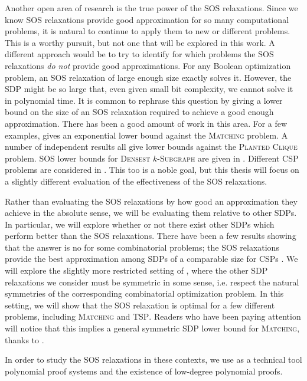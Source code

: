 Another open area of research is the true power of the SOS relaxations.
Since we know SOS relaxations provide good approximation for so many computational problems, it is natural to continue to apply them to new or different problems.
This is a worthy pursuit, but not one that will be explored in this work. 
A different approach would be to try to identify for which problems the SOS relaxations \emph{do not} provide good approximations.
For any Boolean optimization problem, an SOS relaxation of large enough size exactly solves it. 
However, the SDP might be so large that, even given small bit complexity, we cannot solve it in polynomial time. 
It is common to rephrase this question by giving a lower bound on the size of an SOS relaxation required to achieve a good enough approximation. 
There has been a good amount of work in this area. For a few examples, \cite{Gri01} gives an exponential lower bound against the \textsc{Matching} problem. A number of independent results \cite{RS15,MPW15,BHKKMP16} all give lower bounds against the \textsc{Planted Clique} problem. SOS lower bounds for \textsc{Densest $k$-Subgraph} are given in \cite{BCVGZ12}. Different \textsc{CSP} problems are considered in \cite{GMT09,Tul09,Sch08,LRS15}. 
This too is a noble goal, but this thesis will focus on a slightly different evaluation of the effectiveness of the SOS relaxations.

Rather than evaluating the SOS relaxations by how good an approximation they achieve in the absolute sense, we will be evaluating them relative to other SDPs. 
In particular, we will explore whether or not there exist other SDPs which perform better than the SOS relaxations.
There have been a few results showing that the answer is no for some combinatorial problems; the SOS relaxations provide the best approximation among SDPs of a comparable size for CSPs \cite{LRST14,LRS15}. We will explore the slightly more restricted setting of \cite{LRST14}, where the other SDP relaxations we consider must be symmetric in some sense, i.e. respect the natural symmetries of the corresponding combinatorial optimization problem. In this setting, we will show that the SOS relaxation is optimal for a few different problems, including \textsc{Matching} and \textsc{TSP}. Readers who have been paying attention will notice that this implies a general symmetric SDP lower bound for \textsc{Matching}, thanks to \cite{Gri01}. 

In order to study the SOS relaxations in these contexts, we use as a technical tool polynomial proof systems and the existence of low-degree polynomial proofs. 

